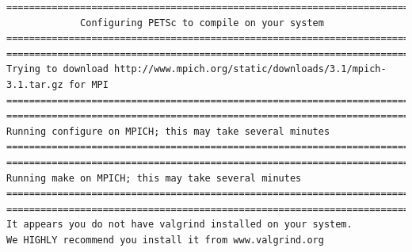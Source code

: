 \documentclass{article}
\begin{document}
\begin{enumerate}
\begin{verbatim}
===============================================================================
             Configuring PETSc to compile on your system                       
===============================================================================
===============================================================================                                                                                                                      
Trying to download http://www.mpich.org/static/downloads/3.1/mpich-3.1.tar.gz for MPI                                                                                                              
===============================================================================                                                                                                                       
===============================================================================                                                                                                                       
Running configure on MPICH; this may take several minutes                                                                                                                                           
===============================================================================                                                                                                                    
===============================================================================                                                                                                                          
Running make on MPICH; this may take several minutes                                                                                                                                                 
===============================================================================                                                                                                                   
===============================================================================                                                                                                                     
It appears you do not have valgrind installed on your system.                                                                                                                                       
We HIGHLY recommend you install it from www.valgrind.org                                                                                                                                          

\end{verbatim}
\end{enumerate}
\end{document}
